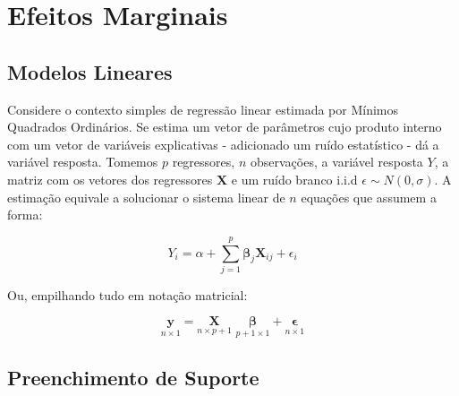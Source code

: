 
\chapter{Efeitos Marginais}

\section{Modelos Lineares}

Considere o contexto simples de regressão linear estimada por Mínimos Quadrados Ordinários. Se estima um vetor de parâmetros cujo produto interno com um vetor de variáveis explicativas - adicionado um ruído estatístico - dá a variável resposta. Tomemos $p$ regressores, $n$ observações, a variável resposta $Y$, a matriz com os vetores dos regressores $\mathbf{X}$ e um ruído branco i.i.d $\epsilon \sim N(0, \sigma)$. A estimação equivale a solucionar o sistema linear de $n$ equações que assumem a forma:

\begin{equation}
    Y_i = \alpha + \sum_{j = 1}^{p} \boldsymbol{\beta}_j \mathbf{X}_{ij} + \epsilon_i 
\end{equation}

Ou, empilhando tudo em notação matricial:

\begin{equation}
    \underset{n \times 1}{\mathbf{y}} = \underset{n \times p+1}{\mathbf{X}} \,\, \underset{p+1 \times 1}{\boldsymbol{\beta}}   + \underset{n \times 1}{\boldsymbol{\epsilon}}
\end{equation}

\section{Preenchimento de Suporte}
